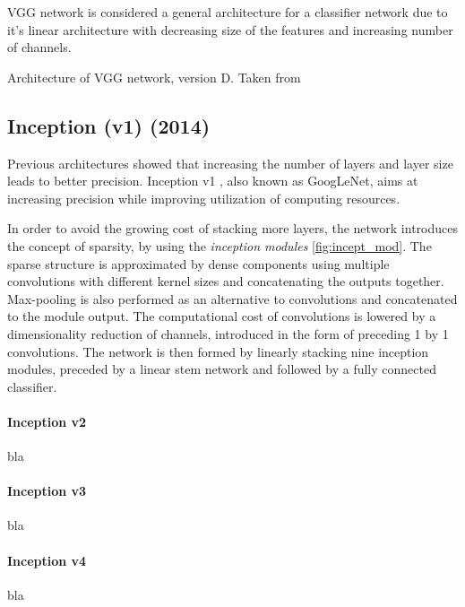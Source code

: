 VGG network is considered a general architecture for a classifier network due to it's linear architecture with decreasing size of the features and increasing number of channels. 

\begin{table}[]
    \centering
    \caption{Architecture of VGG network, version D. Taken from \cite[table 1]{bib:vgg}}
    \label{tab:vggarch}
\end{table}
    
\subsection*{Inception (v1) (2014)}
\label{sec:inception}
Previous architectures showed that increasing the number of layers and layer size leads to better precision. Inception v1 \cite{bib:googlenet}, also known as GoogLeNet, aims at increasing precision while improving utilization of computing resources.

In order to avoid the growing cost of stacking more layers, the network introduces the concept of sparsity, by using the \textit{inception modules} \cref{fig:incept_mod}. The sparse structure is approximated by dense components using multiple convolutions with different kernel sizes and concatenating the outputs together. Max-pooling is also performed as an alternative to convolutions and concatenated to the module output. The computational cost of convolutions is lowered by a dimensionality reduction of channels, introduced in the form of preceding 1 by 1 convolutions. The network is then formed by linearly stacking nine inception modules, preceded by a linear stem network and followed by a fully connected classifier. 

\paragraph{Inception v2} bla

\paragraph{Inception v3} bla

\paragraph{Inception v4} bla


